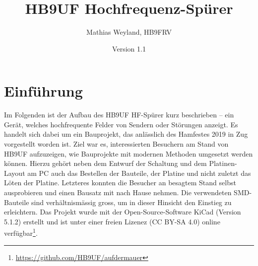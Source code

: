 \documentclass[a4paper,11pt,halfparskip,smallheadings,DIV=10]{scrartcl}
\title{HB9UF Hochfrequenz-Spürer}
\author{Mathias Weyland, HB9FRV}
\date{Version 1.1}
\begin{document}
\maketitle
\vspace{-1.5cm}

\section{Einführung}
Im Folgenden ist der Aufbau des HB9UF HF-Spürer kurz beschrieben -- ein
Gerät, welches hochfrequente Felder von Sendern oder Störungen anzeigt.
Es handelt sich dabei um ein Bauprojekt, das anlässlich des Hamfestes 2019 in
Zug vorgestellt worden ist. Ziel war es, interessierten Besuchern am Stand von
HB9UF aufzuzeigen, wie Bauprojekte mit modernen Methoden umgesetzt werden
können. Hierzu gehört neben dem Entwurf der Schaltung und dem Platinen-Layout
am PC auch das Bestellen der Bauteile, der Platine und nicht zuletzt das
Löten der Platine. Letzteres konnten die Besucher an besagtem Stand selbst
ausprobieren und einen Bausatz mit nach Hause nehmen. Die verwendeten
SMD-Bauteile sind verhältnismässig gross, um in dieser Hinsicht den
Einstieg zu erleichtern. Das Projekt wurde mit der Open-Source-Software
KiCad (Version 5.1.2) erstellt und ist unter einer freien Lizenez
(CC BY-SA 4.0) online  verfügbar\footnote{\url{https://github.com/HB9UF/aufdermauer}}.
\end{document}
